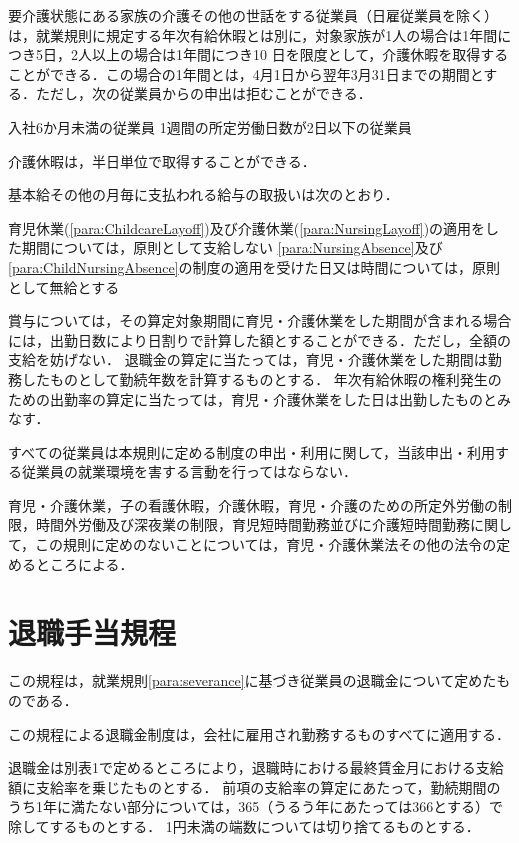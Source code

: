 \documentclass[11pt,a4paper]{jsarticle}
\begin{document}
要介護状態にある家族の介護その他の世話をする従業員（日雇従業員を除く）は，就業規則に規定する年次有給休暇とは別に，対象家族が1人の場合は1年間につき5日，2人以上の場合は1年間につき10 日を限度として，介護休暇を取得することができる．この場合の1年間とは，4月1日から翌年3月31日までの期間とする．ただし，次の従業員からの申出は拒むことができる．
\label{para:NursingAbsence}
\begin{enumerate}
	\itm 	入社6か月未満の従業員
	\itm 	1週間の所定労働日数が2日以下の従業員
\end{enumerate}
\term 介護休暇は，半日単位で取得することができる．

基本給その他の月毎に支払われる給与の取扱いは次のとおり．
\begin{enumerate}
	\itm 育児休業(\ref{para:ChildcareLayoff})及び介護休業(\ref{para:NursingLayoff})の適用をした期間については，原則として支給しない
	\itm \ref{para:NursingAbsence}及び\ref{para:ChildNursingAbsence}の制度の適用を受けた日又は時間については，原則として無給とする
\end{enumerate}
\term 賞与については，その算定対象期間に育児・介護休業をした期間が含まれる場合には，出勤日数により日割りで計算した額とすることができる．ただし，全額の支給を妨げない．
\term 退職金の算定に当たっては，育児・介護休業をした期間は勤務したものとして勤続年数を計算するものとする．
\term 年次有給休暇の権利発生のための出勤率の算定に当たっては，育児・介護休業をした日は出勤したものとみなす．

すべての従業員は本規則に定める制度の申出・利用に関して，当該申出・利用する従業員の就業環境を害する言動を行ってはならない．

育児・介護休業，子の看護休暇，介護休暇，育児・介護のための所定外労働の制限，時間外労働及び深夜業の制限，育児短時間勤務並びに介護短時間勤務に関して，この規則に定めのないことについては，育児・介護休業法その他の法令の定めるところによる．


\clearpage
\section{退職手当規程}

この規程は，就業規則\ref{para:severance}に基づき従業員の退職金について定めたものである．

この規程による退職金制度は，会社に雇用され勤務するものすべてに適用する．

退職金は別表1で定めるところにより，退職時における最終賃金月における支給額に支給率を乗じたものとする．
\term
前項の支給率の算定にあたって，勤続期間のうち1年に満たない部分については，365（うるう年にあたっては366とする）で除してするものとする．
\term 1円未満の端数については切り捨てるものとする．
\end{document}
